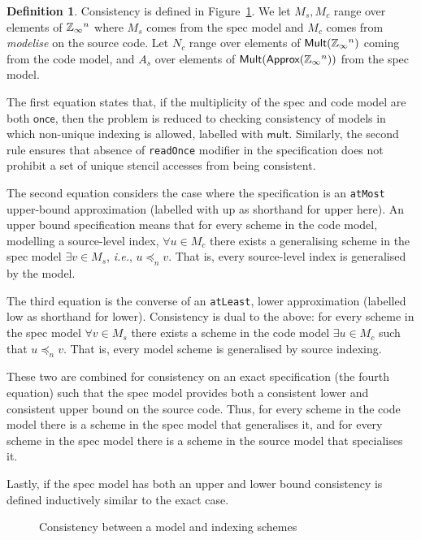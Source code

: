 \documentclass[9pt,preprint]{sigplanconf}
\newcounter{block}
\theoremstyle{definition}
\newtheorem{definition}[block]{Definition}
\newcommand{\ie}{\emph{i.e.}}
\newcommand{\term}[1]{\texttt{#1}}
\begin{document}
\begin{definition}
Consistency is defined in Figure~\ref{fig:consistency}. We let
$M_s, M_c$ range over elements of $\mathbb{Z}_\infty{}^n$ where $M_s$ comes
from the spec model and $M_c$ comes from \textit{modelise} on the
source code. Let $N_c$ range over elements of
$\textsf{Mult}(\mathbb{Z}_\infty{}^n)$ coming from the code model, and $A_s$
over elements of $\textsf{Mult}(\textsf{Approx}(\mathbb{Z}_\infty{}^n))$ from the spec model.

The first equation states that, if the multiplicity of the spec and code
model are both $\mathsf{once}$, then the problem is reduced to checking consistency of
models in which non-unique indexing is allowed, labelled with
$\mathsf{mult}$. Similarly, the second rule ensures that absence of
\texttt{readOnce} modifier in the specification does not prohibit a set of
unique stencil accesses from being consistent.

The second equation considers the case where the specification is
an \term{atMost} upper-bound approximation (labelled with \textsf{up}
as shorthand for \textsf{upper} here). 
An upper bound specification means that for every scheme in the code
model, modelling a source-level index, $\forall u \in M_c$ there exists
a generalising scheme in the spec model $\exists v \in M_s$, \ie{}, $u
\preceq_n v$. That is, every source-level index is generalised by the model.

The third equation is the converse of an \term{atLeast},
lower approximation (labelled \textsf{low} as shorthand for
\textsf{lower}). Consistency is dual to the above: 
for every scheme in the spec model $\forall v \in M_s$ there
exists a scheme in the code model $\exists u \in M_c$ such that $u
\preceq_n v$. That is, every model scheme is generalised by source indexing.

These two are combined for consistency on an \textsf{exact}
specification (the fourth equation) such that the spec model
provides both a consistent lower and consistent upper bound on
the source code. Thus, for every scheme in the code model there
is a scheme in the spec model that generalises it, and for every
scheme in the spec model there is a scheme in the source model that
specialises it.  

Lastly, if the spec model has both an upper and lower bound
consistency is defined inductively similar to the \textsf{exact} case.
\end{definition}

\begin{figure}
\vspace{-0.4em}

\caption{Consistency between a model and indexing schemes}
\label{fig:consistency}
\vspace{-0.9em}
\end{figure}
\end{document}
